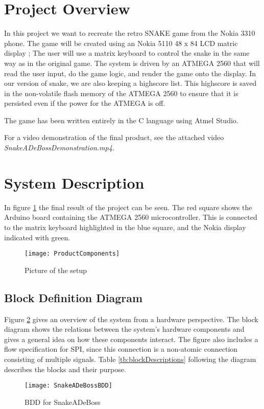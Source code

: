 \section{Project Overview}
	In this project we want to recreate the retro SNAKE game from the Nokia 3310 phone. The game will be created using an Nokia 5110 48 x 84 LCD matric display \cite{NokiaDisplay}; The user will use a matrix keyboard to control the snake in the same way as in the original game. The system is driven by an ATMEGA 2560 that will read the user input, do the game logic, and render the game onto the display. In our version of snake, we are also keeping a highscore list. This highscore is saved in the non-volatile flash memory of the ATMEGA 2560 to ensure that it is persisted even if the power for the ATMEGA is off.
	
	The game has been written entirely in the C language using Atmel Studio.
	
	For a video demonstration of the final product, see the attached video \textit{SnakeADeBossDemonstration.mp4}.

\section{System Description}
	In figure \ref{ProductComponents} the final result of the project can be seen. The red square shows the Arduino board containing the ATMEGA 2560 microcontroller. This is connected to the matrix keyboard highlighted in the blue square, and the Nokia display indicated with green. 
	
	\begin{figure}[H]
		\texttt{[image: ProductComponents]}
		\centering
		\caption{Picture of the setup}
		\label{ProductComponents}
	\end{figure}


	\subsection{Block Definition Diagram}
		Figure \ref{fig:bdd} gives an overview of the system from a hardware perspective. The block diagram shows the relations between the system's hardware components and gives a general idea on how these components interact. The figure also includes a flow specification for SPI, since this connection is a non-atomic connection consisting of multiple signals. Table \ref{tb:blockDescriptions} following the diagram describes the blocks and their purpose.
		
		\begin{figure}[H]
			\texttt{[image: SnakeADeBossBDD]}
			\centering
			\caption{BDD for SnakeADeBoss}
			\label{fig:bdd}
		\end{figure}
		
